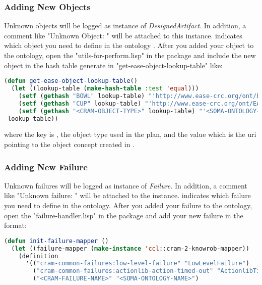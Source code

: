 \subsubsection{Adding New Objects}
Unknown objects will be logged as instance of \textit{DesignedArtifact}.
In addition, a comment like "Unknown Object: " will be attached to this instance.
 indicates which object you need to define in the ontology .
After you added your object to the ontology, open the "utils-for-perform.lisp" in the \cramloggerpackage package and include the new object in the hash table generate in "get-ease-object-lookup-table" like:

\begin{lstlisting}[language=lisp, caption=Linking the CRAM Object to the Ontology Concept]
(defun get-ease-object-lookup-table()
  (let ((lookup-table (make-hash-table :test 'equal)))
    (setf (gethash "BOWL" lookup-table) "'http://www.ease-crc.org/ont/EASE-OBJ.owl#Bowl'")
    (setf (gethash "CUP" lookup-table) "'http://www.ease-crc.org/ont/EASE-OBJ.owl#Cup'")
    (setf (gethash "<CRAM-OBJECT-TYPE>" lookup-table) "'<SOMA-ONTOLOGY-ENTITY-URL>'")
 lookup-table))
\end{lstlisting}

where the key is , the object type used in the \cram plan, and the value which is the uri pointing to the object concept created in \soma.

\subsubsection{Adding New Failure}
Unknown \cram failures will be logged as instance of \textit{Failure}.
In addition, a comment like "Unknown failure: " will be attached to the instance.
 indicates which failure you need to define in the ontology.
After you added your failure to the ontology, open the "failure-handler.lisp" in the \cramloggerpackage package and add your new failure in the format:

\begin{lstlisting}[language=lisp, caption=Linking the CRAM Action to the Ontology Concept]
(defun init-failure-mapper ()
  (let ((failure-mapper (make-instance 'ccl::cram-2-knowrob-mapper))
    (definition
      '(("cram-common-failures:low-level-failure" "LowLevelFailure")
        ("cram-common-failures:actionlib-action-timed-out" "ActionlibTimeout")
        ("<CRAM-FAILURE-NAME>" "<SOMA-ONTOLOGY-NAME>")
\end{lstlisting}

